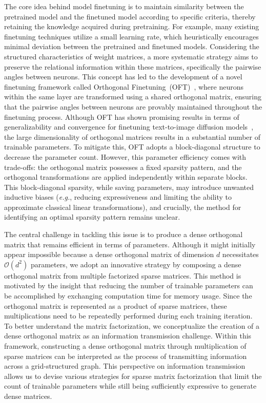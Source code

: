 The core idea behind model finetuning is to maintain similarity between the pretrained model and the finetuned model according to specific criteria, thereby retaining the knowledge acquired during pretraining. For example, many existing finetuning techniques utilize a small learning rate, which heuristically encourages minimal deviation between the pretrained and finetuned models. Considering the structured characteristics of weight matrices, a more systematic strategy aims to preserve the relational information within these matrices, specifically the pairwise angles between neurons. This concept has led to the development of a novel finetuning framework called Orthogonal Finetuning~(OFT)~\cite{qiu2023controlling}, where neurons within the same layer are transformed using a shared orthogonal matrix, ensuring that the pairwise angles between neurons are provably maintained throughout the finetuning process. Although OFT has shown promising results in terms of generalizability and convergence for finetuning text-to-image diffusion models~\cite{qiu2023controlling}, the large dimensionality of orthogonal matrices results in a substantial number of trainable parameters. To mitigate this, OFT adopts a block-diagonal structure to decrease the parameter count. However, this parameter efficiency comes with trade-offs: the orthogonal matrix possesses a fixed sparsity pattern, and the orthogonal transformations are applied independently within separate blocks. This block-diagonal sparsity, while saving parameters, may introduce unwanted inductive biases (\emph{e.g.}, reducing expressiveness and limiting the ability to approximate classical linear transformations), and crucially, the method for identifying an optimal sparsity pattern remains unclear.

The central challenge in tackling this issue is to produce a dense orthogonal matrix that remains efficient in terms of parameters. Although it might initially appear impossible because a dense orthogonal matrix of dimension $d$ necessitates $\mathcal{O}(d^2)$ parameters, we adopt an innovative strategy by composing a dense orthogonal matrix from multiple factorized sparse matrices. This method is motivated by the insight that reducing the number of trainable parameters can be accomplished by exchanging computation time for memory usage. Since the orthogonal matrix is represented as a product of sparse matrices, these multiplications need to be repeatedly performed during each training iteration. To better understand the matrix factorization, we conceptualize the creation of a dense orthogonal matrix as an information transmission challenge. Within this framework, constructing a dense orthogonal matrix through multiplication of sparse matrices can be interpreted as the process of transmitting information across a grid-structured graph. This perspective on information transmission allows us to devise various strategies for sparse matrix factorization that limit the count of trainable parameters while still being sufficiently expressive to generate dense matrices.

